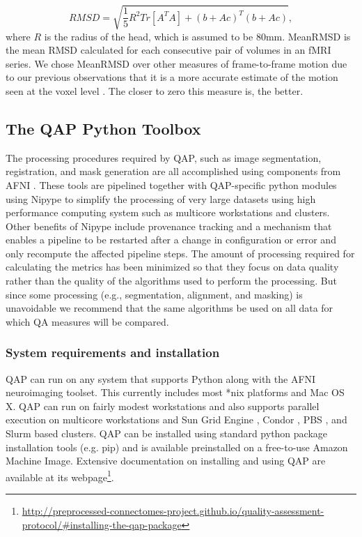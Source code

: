 \begin{equation}
    RMSD = \sqrt{\frac{1}{5}R^2Tr[A^{T}A]+(b+Ac)^T(b+Ac)},
\end{equation}
where $R$ is the radius of the head, which is assumed to be 80mm. MeanRMSD is the mean RMSD calculated for each consecutive pair of volumes in an fMRI series. We chose MeanRMSD over other measures of frame-to-frame motion \citep[e.g.][]{power2012,VanDijk2012} due to our previous observations that it is a more accurate estimate of the motion seen at the voxel level \citep{Yan2013}. The closer to zero this measure is, the better.


\subsection{The QAP Python Toolbox}
\label{sec:tooblox}

The processing procedures required by QAP, such as image segmentation, registration, and mask generation are all accomplished using components from AFNI \citep{cox1996}. These tools are pipelined together with QAP-specific python modules using Nipype \citep{gorgolewski_2016_50186} to simplify the processing of very large datasets using high performance computing system such as multicore workstations and clusters. Other benefits of Nipype include provenance tracking and a mechanism that enables a pipeline to be restarted after a change in configuration or error and only recompute the affected pipeline steps. The amount of processing required for calculating the metrics has been minimized so that they focus on data quality rather than the quality of the algorithms used to perform the processing. But since some processing (e.g., segmentation, alignment, and masking) is unavoidable we recommend that the same algorithms be used on all data for which QA measures will be compared.

\subsubsection{System requirements and installation}

QAP can run on any system that supports Python along with the AFNI neuroimaging toolset. This currently includes most *nix platforms and Mac OS X. QAP can run on fairly modest workstations and also supports parallel execution on multicore workstations and Sun Grid Engine \citep{Gentzsch2001}, Condor \citep{condor2005}, PBS \citep{pbs2001}, and Slurm \citep{slurm2002} based clusters. QAP can be installed using standard python package installation tools (e.g. pip) and is available preinstalled on a free-to-use Amazon Machine Image. Extensive documentation on installing and using QAP are available at its webpage\footnote{\url{http://preprocessed-connectomes-project.github.io/quality-assessment-protocol/\#installing-the-qap-package}}.


